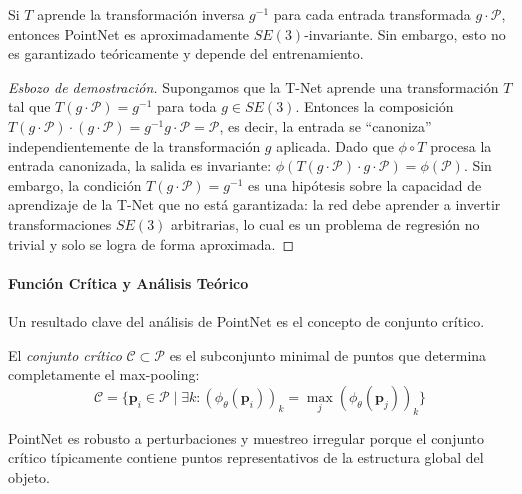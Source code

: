 \begin{proposition}
Si $T$ aprende la transformación inversa $g^{-1}$ para cada entrada transformada $g \cdot \mathcal{P}$, entonces PointNet es aproximadamente $SE(3)$-invariante. Sin embargo, esto no es garantizado teóricamente y depende del entrenamiento.
\end{proposition}

\begin{proof}[Esbozo de demostración]
Supongamos que la T-Net aprende una transformación $T$ tal que $T(g \cdot \mathcal{P}) = g^{-1}$ para toda $g \in SE(3)$. Entonces la composición $T(g \cdot \mathcal{P}) \cdot (g \cdot \mathcal{P}) = g^{-1} g \cdot \mathcal{P} = \mathcal{P}$, es decir, la entrada se ``canoniza'' independientemente de la transformación $g$ aplicada. Dado que $\phi \circ T$ procesa la entrada canonizada, la salida es invariante: $\phi(T(g \cdot \mathcal{P}) \cdot g \cdot \mathcal{P}) = \phi(\mathcal{P})$. Sin embargo, la condición $T(g \cdot \mathcal{P}) = g^{-1}$ es una hipótesis sobre la capacidad de aprendizaje de la T-Net que no está garantizada: la red debe aprender a invertir transformaciones $SE(3)$ arbitrarias, lo cual es un problema de regresión no trivial y solo se logra de forma aproximada.
\end{proof}

\paragraph{Función Crítica y Análisis Teórico}

Un resultado clave del análisis de PointNet es el concepto de conjunto crítico.

\begin{definition}\label{def:critical_set_pointnet}
El \textit{conjunto crítico} $\mathcal{C} \subset \mathcal{P}$ es el subconjunto minimal de puntos que determina completamente el max-pooling:
\begin{equation}
\mathcal{C} = \{\mathbf{p}_i \in \mathcal{P} \mid \exists k: (\phi_\theta(\mathbf{p}_i))_k = \max_{j}(\phi_\theta(\mathbf{p}_j))_k\}
\end{equation}
\end{definition}

\begin{proposition}
PointNet es robusto a perturbaciones y muestreo irregular porque el conjunto crítico típicamente contiene puntos representativos de la estructura global del objeto.
\end{proposition}


